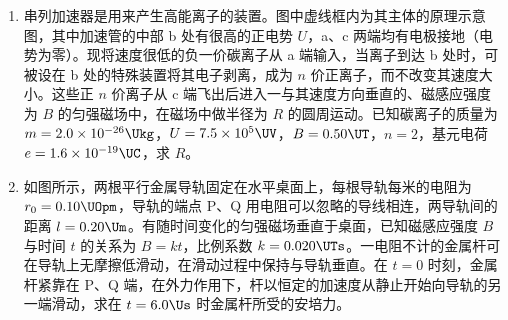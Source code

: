\documentclass[\gkver]{gaokaozhenti}
\begin{document}
\begin{enumerate}
\item
串列加速器是用来产生高能离子的装置。图中虚线框内为其主体的原理示意图，其中加速管的中部 b 处有很高的正电势 $U$，a、c 两端均有电极接地（电势为零）。现将速度很低的负一价碳离子从 a 端输入，当离子到达 b 处时，可被设在 b 处的特殊装置将其电子剥离，成为 $n$ 价正离子，而不改变其速度大小。这些正 $n$ 价离子从 c 端飞出后进入一与其速度方向垂直的、磁感应强度为 $B$ 的匀强磁场中，在磁场中做半径为 $R$ 的圆周运动。已知碳离子的质量为 $m=2.0\times10^{-26}\Ukg$，$U=7.5\times10^{5}\UV$，$B=0.50\UT$，$n=2$，基元电荷 $e=1.6\times10^{-19}\UC$，求 $R$。
\onepicture[align=right, w=7.48cm]{}

\item
如图所示，两根平行金属导轨固定在水平桌面上，每根导轨每米的电阻为 $r_{0}=0.10\UOpm$，导轨的端点 P、Q 用电阻可以忽略的导线相连，两导轨间的距离 $l=0.20\Um$。有随时间变化的匀强磁场垂直于桌面，已知磁感应强度 $B$ 与时间 $t$ 的关系为 $B=kt$，比例系数 $k=0.020\UTs$。一电阻不计的金属杆可在导轨上无摩擦低滑动，在滑动过程中保持与导轨垂直。在 $t=0$ 时刻，金属杆紧靠在 P、Q 端，在外力作用下，杆以恒定的加速度从静止开始向导轨的另一端滑动，求在 $t=6.0\Us$ 时金属杆所受的安培力。
\onepicture[align=right, w=5.38cm]{}


\end{enumerate}
\end{document}
